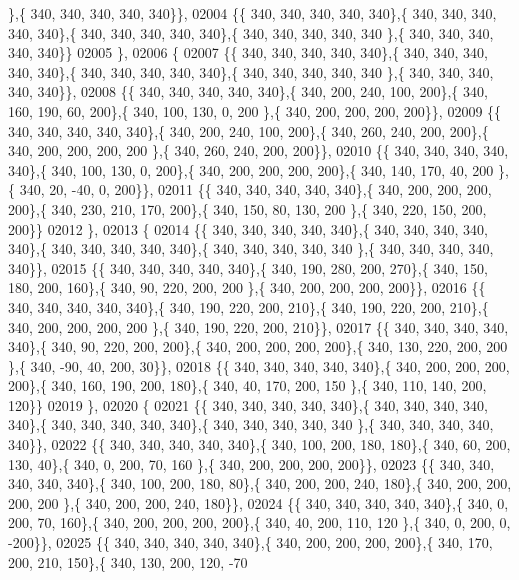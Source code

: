 \begin{DoxyCode}
      \},\{ 340, 340, 340, 340, 340\}\},
02004 \{\{ 340, 340, 340, 340, 340\},\{ 340, 340, 340, 340, 340\},\{ 340, 340, 340, 340, 340\},\{ 340, 340, 340, 340, 340
      \},\{ 340, 340, 340, 340, 340\}\}
02005 \},
02006 \{
02007 \{\{ 340, 340, 340, 340, 340\},\{ 340, 340, 340, 340, 340\},\{ 340, 340, 340, 340, 340\},\{ 340, 340, 340, 340, 340
      \},\{ 340, 340, 340, 340, 340\}\},
02008 \{\{ 340, 340, 340, 340, 340\},\{ 340, 200, 240, 100, 200\},\{ 340, 160, 190,  60, 200\},\{ 340, 100, 130,   0, 200
      \},\{ 340, 200, 200, 200, 200\}\},
02009 \{\{ 340, 340, 340, 340, 340\},\{ 340, 200, 240, 100, 200\},\{ 340, 260, 240, 200, 200\},\{ 340, 200, 200, 200, 200
      \},\{ 340, 260, 240, 200, 200\}\},
02010 \{\{ 340, 340, 340, 340, 340\},\{ 340, 100, 130,   0, 200\},\{ 340, 200, 200, 200, 200\},\{ 340, 140, 170,  40, 200
      \},\{ 340,  20, -40,   0, 200\}\},
02011 \{\{ 340, 340, 340, 340, 340\},\{ 340, 200, 200, 200, 200\},\{ 340, 230, 210, 170, 200\},\{ 340, 150,  80, 130, 200
      \},\{ 340, 220, 150, 200, 200\}\}
02012 \},
02013 \{
02014 \{\{ 340, 340, 340, 340, 340\},\{ 340, 340, 340, 340, 340\},\{ 340, 340, 340, 340, 340\},\{ 340, 340, 340, 340, 340
      \},\{ 340, 340, 340, 340, 340\}\},
02015 \{\{ 340, 340, 340, 340, 340\},\{ 340, 190, 280, 200, 270\},\{ 340, 150, 180, 200, 160\},\{ 340,  90, 220, 200, 200
      \},\{ 340, 200, 200, 200, 200\}\},
02016 \{\{ 340, 340, 340, 340, 340\},\{ 340, 190, 220, 200, 210\},\{ 340, 190, 220, 200, 210\},\{ 340, 200, 200, 200, 200
      \},\{ 340, 190, 220, 200, 210\}\},
02017 \{\{ 340, 340, 340, 340, 340\},\{ 340,  90, 220, 200, 200\},\{ 340, 200, 200, 200, 200\},\{ 340, 130, 220, 200, 200
      \},\{ 340, -90,  40, 200,  30\}\},
02018 \{\{ 340, 340, 340, 340, 340\},\{ 340, 200, 200, 200, 200\},\{ 340, 160, 190, 200, 180\},\{ 340,  40, 170, 200, 150
      \},\{ 340, 110, 140, 200, 120\}\}
02019 \},
02020 \{
02021 \{\{ 340, 340, 340, 340, 340\},\{ 340, 340, 340, 340, 340\},\{ 340, 340, 340, 340, 340\},\{ 340, 340, 340, 340, 340
      \},\{ 340, 340, 340, 340, 340\}\},
02022 \{\{ 340, 340, 340, 340, 340\},\{ 340, 100, 200, 180, 180\},\{ 340,  60, 200, 130,  40\},\{ 340,   0, 200,  70, 160
      \},\{ 340, 200, 200, 200, 200\}\},
02023 \{\{ 340, 340, 340, 340, 340\},\{ 340, 100, 200, 180,  80\},\{ 340, 200, 200, 240, 180\},\{ 340, 200, 200, 200, 200
      \},\{ 340, 200, 200, 240, 180\}\},
02024 \{\{ 340, 340, 340, 340, 340\},\{ 340,   0, 200,  70, 160\},\{ 340, 200, 200, 200, 200\},\{ 340,  40, 200, 110, 120
      \},\{ 340,   0, 200,   0, -200\}\},
02025 \{\{ 340, 340, 340, 340, 340\},\{ 340, 200, 200, 200, 200\},\{ 340, 170, 200, 210, 150\},\{ 340, 130, 200, 120, -70

\end{DoxyCode}
